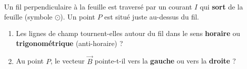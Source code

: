 \documentclass[11pt,a4paper]{article}
\newcommand{\vv}[1]{\vec{#1}}\newcommand{\ds}{\displaystyle}
\begin{document}
\begin{exo}
Un fil perpendiculaire à la feuille est traversé par un courant $I$ qui \textbf{sort} de la feuille
(symbole $\odot$). Un point $P$ est situé juste au-dessus du fil.
\begin{center}
\end{center}
\begin{enumerate}[label=\alph*)]
  \item Les lignes de champ tournent-elles autour du fil dans le sens \textbf{horaire} ou
        \textbf{trigonométrique} (anti-horaire) ?
  \item Au point $P$, le vecteur $\vv{B}$ pointe-t-il vers la \textbf{gauche} ou vers la
        \textbf{droite} ?
\end{enumerate}
\end{exo}
\end{document}
